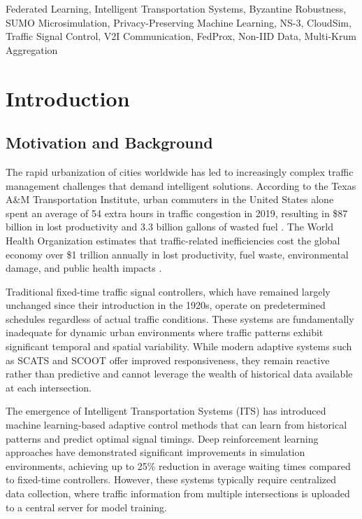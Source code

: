 \documentclass[conference]{IEEEtran}
\begin{document}
\begin{IEEEkeywords}
Federated Learning, Intelligent Transportation Systems, Byzantine Robustness, SUMO Microsimulation, Privacy-Preserving Machine Learning, NS-3, CloudSim, Traffic Signal Control, V2I Communication, FedProx, Non-IID Data, Multi-Krum Aggregation
\end{IEEEkeywords}

\section{Introduction}

\subsection{Motivation and Background}
The rapid urbanization of cities worldwide has led to increasingly complex traffic management challenges that demand intelligent solutions. According to the Texas A\&M Transportation Institute, urban commuters in the United States alone spent an average of 54 extra hours in traffic congestion in 2019, resulting in \$87 billion in lost productivity and 3.3 billion gallons of wasted fuel \cite{schrank2019}. The World Health Organization estimates that traffic-related inefficiencies cost the global economy over \$1 trillion annually in lost productivity, fuel waste, environmental damage, and public health impacts \cite{who2021}.

Traditional fixed-time traffic signal controllers, which have remained largely unchanged since their introduction in the 1920s, operate on predetermined schedules regardless of actual traffic conditions. These systems are fundamentally inadequate for dynamic urban environments where traffic patterns exhibit significant temporal and spatial variability. While modern adaptive systems such as SCATS \cite{sims1980} and SCOOT \cite{hunt1981} offer improved responsiveness, they remain reactive rather than predictive and cannot leverage the wealth of historical data available at each intersection.

The emergence of Intelligent Transportation Systems (ITS) has introduced machine learning-based adaptive control methods that can learn from historical patterns and predict optimal signal timings. Deep reinforcement learning approaches \cite{wei2018intellilight, chu2019multi} have demonstrated significant improvements in simulation environments, achieving up to 25\% reduction in average waiting times compared to fixed-time controllers. However, these systems typically require centralized data collection, where traffic information from multiple intersections is uploaded to a central server for model training.
\end{document}
